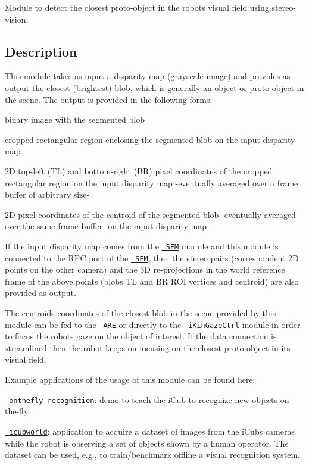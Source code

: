 Module to detect the closest proto-\/object in the robot\textquotesingle{}s visual field using stereo-\/vision.

\subsection*{Description}

This module takes as input a disparity map (grayscale image) and provides as output the closest (brightest) blob, which is generally an object or proto-\/object in the scene. The output is provided in the following forms\+:


\begin{DoxyItemize}
\item binary image with the segmented blob
\item cropped rectangular region enclosing the segmented blob on the input disparity map
\item 2D top-\/left (TL) and bottom-\/right (BR) pixel coordinates of the cropped rectangular region on the input disparity map -\/eventually averaged over a frame buffer of arbitrary size-\/
\item 2D pixel coordinates of the centroid of the segmented blob -\/eventually averaged over the same frame buffer-\/ on the input disparity map
\end{DoxyItemize}

If the input disparity map comes from the \href{https://github.com/robotology/stereo-vision}{\texttt{ S\+FM}} module and this module is connected to the R\+PC port of the \href{https://github.com/robotology/stereo-vision}{\texttt{ S\+FM}}, then the stereo pairs (correspondent 2D points on the other camera) and the 3D re-\/projections in the world reference frame of the above points (blob\textquotesingle{}s TL and BR R\+OI vertices and centroid) are also provided as output.

The centroid\textquotesingle{}s coordinates of the closest blob in the scene provided by this module can be fed to the \href{http://wiki.icub.org/iCub_documentation/group__actionsRenderingEngine.html}{\texttt{ A\+RE}} or directly to the \href{http://wiki.icub.org/iCub_documentation/group__iKinGazeCtrl.html}{\texttt{ i\+Kin\+Gaze\+Ctrl}} module in order to focus the robot\textquotesingle{}s gaze on the object of interest. If the data connection is streamlined then the robot keeps on focusing on the closest proto-\/object in its visual field.

Example applications of the usage of this module can be found here\+:
\begin{DoxyItemize}
\item \href{https://github.com/robotology/onthefly-recognition}{\texttt{ onthefly-\/recognition}}\+: demo to teach the i\+Cub to recognize new objects on-\/the-\/fly.
\item \href{https://github.com/GiuliaP/icubworld}{\texttt{ icubworld}}\+: application to acquire a dataset of images from the i\+Cub\textquotesingle{}s cameras while the robot is observing a set of objects shown by a human operator. The dataset can be used, e.\+g., to train/benchmark offline a visual recognition system. 
\end{DoxyItemize}
